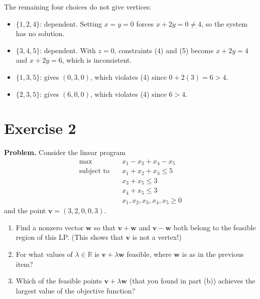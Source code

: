 \documentclass[11pt]{article}
\begin{document}
The remaining four choices do not give vertices:
\begin{itemize}
  \item $\{1,2,4\}$: dependent. Setting $x = y = 0$ forces $x + 2y = 0 \neq 4$, so the system has no solution.
  \item $\{3,4,5\}$: dependent. With $z = 0$, constraints (4) and (5) become $x + 2y = 4$ and $x + 2y = 6$, which is inconsistent.
  \item $\{1,3,5\}$: gives $(0,3,0)$, which violates (4) since $0 + 2(3) = 6 > 4$.
  \item $\{2,3,5\}$: gives $(6,0,0)$, which violates (4) since $6 > 4$.
\end{itemize}

\clearpage
\section*{Exercise 2}

\noindent\textbf{Problem.}
Consider the linear program
\begin{align*}
\max\quad & x_1 - x_2 + x_4 - x_5 \\
\text{subject to}\quad & x_1 + x_2 + x_3 \le 5 \\
& x_3 + x_5 \le 3 \\
& x_4 + x_5 \le 3 \\
& x_1, x_2, x_3, x_4, x_5 \ge 0
\end{align*}
and the point $\mathbf{v} = (3, 2, 0, 0, 3)$.
\begin{enumerate}[label=(\alph*)]
  \item Find a nonzero vector $\mathbf{w}$ so that $\mathbf{v} + \mathbf{w}$ and $\mathbf{v} - \mathbf{w}$ both belong to the feasible region of this LP. (This shows that $\mathbf{v}$ is not a vertex!)
  \item For what values of $\lambda \in \mathbb{R}$ is $\mathbf{v} + \lambda \mathbf{w}$ feasible, where $\mathbf{w}$ is as in the previous item?
  \item Which of the feasible points $\mathbf{v} + \lambda \mathbf{w}$ (that you found in part (b)) achieves the largest value of the objective function?
\end{enumerate}
\end{document}
